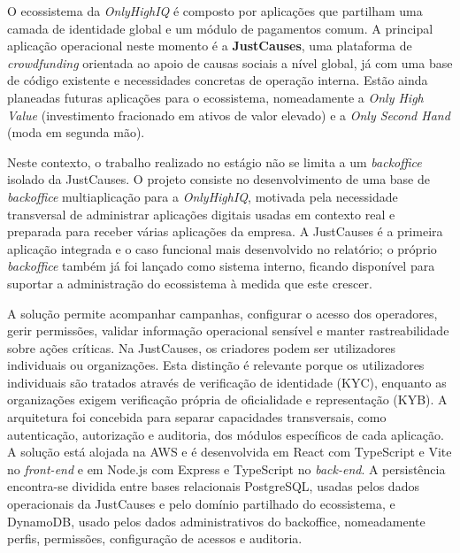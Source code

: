 O ecossistema da \textit{OnlyHighIQ} é composto por aplicações que partilham uma camada de identidade global e um módulo de pagamentos comum. A principal aplicação operacional neste momento é a \textbf{JustCauses}, uma plataforma de \textit{crowdfunding} orientada ao apoio de causas sociais a nível global, já com uma base de código existente e necessidades concretas de operação interna. Estão ainda planeadas futuras aplicações para o ecossistema, nomeadamente a \textit{Only High Value} (investimento fracionado em ativos de valor elevado) e a \textit{Only Second Hand} (moda em segunda mão). \cite{BackofficeSpec}

Neste contexto, o trabalho realizado no estágio não se limita a um \textit{backoffice} isolado da JustCauses. O projeto consiste no desenvolvimento de uma base de \textit{backoffice} multiaplicação para a \textit{OnlyHighIQ}, motivada pela necessidade transversal de administrar aplicações digitais usadas em contexto real e preparada para receber várias aplicações da empresa. A JustCauses é a primeira aplicação integrada e o caso funcional mais desenvolvido no relatório; o próprio \textit{backoffice} também já foi lançado como sistema interno, ficando disponível para suportar a administração do ecossistema à medida que este crescer.

A solução permite acompanhar campanhas, configurar o acesso dos operadores, gerir permissões, validar informação operacional sensível e manter rastreabilidade sobre ações críticas. Na JustCauses, os criadores podem ser utilizadores individuais ou organizações. Esta distinção é relevante porque os utilizadores individuais são tratados através de verificação de identidade (\gls{KYC}), enquanto as organizações exigem verificação própria de oficialidade e representação (\gls{KYB}). A arquitetura foi concebida para separar capacidades transversais, como autenticação, autorização e auditoria, dos módulos específicos de cada aplicação. A solução está alojada na \gls{AWS} e é desenvolvida em React com TypeScript e Vite no \textit{front-end} e em Node.js com Express e TypeScript no \textit{back-end}. A persistência encontra-se dividida entre bases relacionais \gls{PostgreSQL}, usadas pelos dados operacionais da JustCauses e pelo domínio partilhado do ecossistema, e DynamoDB, usado pelos dados administrativos do backoffice, nomeadamente perfis, permissões, configuração de acessos e auditoria.


